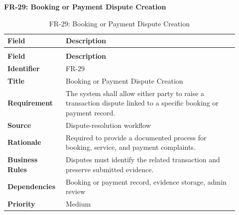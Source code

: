 \documentclass[12pt,a4paper]{article}
\begin{document}
\noindent\textbf{FR-29: Booking or Payment Dispute Creation}\par
\vspace{4pt}
\begingroup\small\setlength{\tabcolsep}{4pt}\renewcommand{\arraystretch}{1.15}
\begin{longtable}{|>{\raggedright\arraybackslash}p{0.22\linewidth}|>{\raggedright\arraybackslash}p{0.70\linewidth}|}
\caption{FR-29: Booking or Payment Dispute Creation}\label{tab:fr-29}\\
\hline
\textbf{Field} & \textbf{Description} \\ \hline
\endfirsthead
\multicolumn{2}{c}{Table \thetable\ Booking or Payment Dispute Creation (continued)}\\
\hline
\textbf{Field} & \textbf{Description} \\ \hline
\endhead
\textbf{Identifier} & FR-29 \\ \hline
\textbf{Title} & Booking or Payment Dispute Creation \\ \hline
\textbf{Requirement} & The system shall allow either party to raise a transaction dispute linked to a specific booking or payment record. \\ \hline
\textbf{Source} & Dispute-resolution workflow \\ \hline
\textbf{Rationale} & Required to provide a documented process for booking, service, and payment complaints. \\ \hline
\textbf{Business Rules} & Disputes must identify the related transaction and preserve submitted evidence. \\ \hline
\textbf{Dependencies} & Booking or payment record, evidence storage, admin review \\ \hline
\textbf{Priority} & Medium \\ \hline
\end{longtable}
\endgroup
\end{document}

